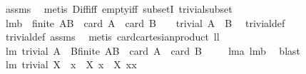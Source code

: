 \begin{isabellebody}
%
\isatagproof
{}\isamarkupfalse%
\ assms\ \isamarkupfalse%
\ {\isacharparenleft}metis\ Diff{\isacharunderscore}iff\ empty{\isacharunderscore}iff\ subsetI\ trivial{\isacharunderscore}subset{\isacharparenright}%
\endisatagproof
{\isafoldproof}%
%
\isadelimproof
\isanewline
%
\endisadelimproof
\isanewline
{}\isamarkupfalse%
\ lm{}{}{}b{\isacharcolon}\ \ {\isachardoublequoteopen}{\isacharparenleft}finite\ {\isacharparenleft}A{\isasymtimes}B{\isacharparenright}\ {\isacharampersand}\ card\ A\ {\isacharasterisk}\ {\isacharparenleft}card\ B{\isacharparenright}\ {\isasymle}\ {}{\isacharparenright}{\isachardoublequoteclose}\ \ {\isachardoublequoteopen}trivial\ {\isacharparenleft}A\ {\isasymtimes}\ B{\isacharparenright}{\isachardoublequoteclose}\ \isanewline
%
\isadelimproof
%
\endisadelimproof
%
\isatagproof
{}\isamarkupfalse%
\ trivial{\isacharunderscore}def\ \isamarkupfalse%
\ trivial{\isacharunderscore}def\ assms\ \isamarkupfalse%
\ {\isacharparenleft}metis\ card{\isacharunderscore}cartesian{\isacharunderscore}product\ ll{}{}{\isacharparenright}%
\endisatagproof
{\isafoldproof}%
%
\isadelimproof
\isanewline
%
\endisadelimproof
\isanewline
{}\isamarkupfalse%
\ lm{}{}{}{\isacharcolon}\ {\isachardoublequoteopen}trivial\ {\isacharparenleft}A\ {\isasymtimes}\ B{\isacharparenright}{\isacharequal}{\isacharparenleft}finite\ {\isacharparenleft}A{\isasymtimes}B{\isacharparenright}\ {\isacharampersand}\ card\ A\ {\isacharasterisk}\ {\isacharparenleft}card\ B{\isacharparenright}\ {\isasymle}\ {}{\isacharparenright}{\isachardoublequoteclose}%
\isadelimproof
\ %
\endisadelimproof
%
\isatagproof
{}\isamarkupfalse%
\ lm{}{}{}a\ lm{}{}{}b\ \isamarkupfalse%
\ blast%
\endisatagproof
{\isafoldproof}%
%
\isadelimproof
%
\endisadelimproof
\isanewline
\isanewline
{}\isamarkupfalse%
\ lm{}{}{\isacharcolon}\ {\isachardoublequoteopen}trivial\ X\ {\isacharequal}\ {\isacharparenleft}{\isasymforall}x{}\ {\isasymin}\ X{\isachardot}\ {\isasymforall}x{}\ {\isasymin}\ X{\isachardot}\ x{}{\isacharequal}x{}{\isacharparenright}{\isachardoublequoteclose}%
\isadelimproof
\ %
\endisadelimproof
%
\isatagproof
{}\isamarkupfalse%

\end{isabellebody}

